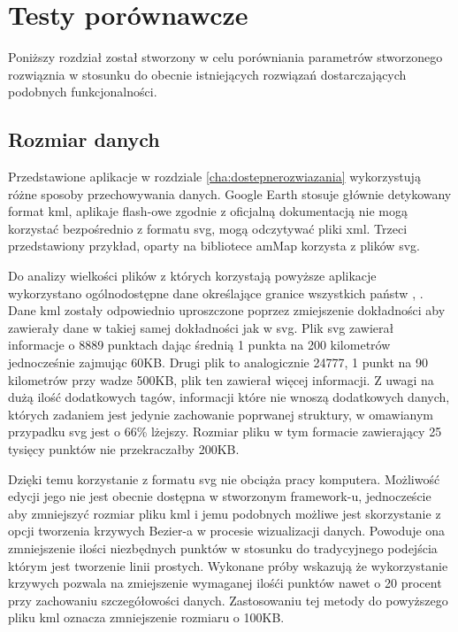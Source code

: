 \chapter{Testy porównawcze}
\label{cha:comparisonTests}

Poniższy rozdział został stworzony w celu porówniania parametrów stworzonego rozwiąznia w stosunku do obecnie istniejących rozwiązań dostarczających podobnych funkcjonalności.

\section{Rozmiar danych}
\label{sec:dataSize}

Przedstawione aplikacje w rozdziale \ref{cha:dostepnerozwiazania} wykorzystują różne sposoby przechowywania danych. Google Earth stosuje głównie detykowany format kml, aplikaje flash-owe zgodnie z oficjalną dokumentacją \cite{flashFormats} nie mogą korzystać bezpośrednio z formatu svg, mogą odczytywać pliki xml. Trzeci przedstawiony przykład, oparty na bibliotece amMap korzysta z plików svg.

Do analizy wielkości plików z których korzystają powyższe aplikacje wykorzystano ogólnodostępne dane określające granice wszystkich państw \cite{kmlExample}, \cite{svgExample}. Dane kml zostały odpowiednio uproszczone poprzez zmiejszenie dokładności aby zawierały dane w takiej samej dokładności jak w svg. Plik svg zawierał informacje o 8889 punktach dając średnią 1 punkta na 200 kilometrów jednocześnie zajmując 60KB. Drugi plik to analogicznie 24777, 1 punkt na 90 kilometrów przy wadze 500KB, plik ten zawierał więcej informacji. Z uwagi na dużą ilość dodatkowych tagów, informacji które nie wnoszą dodatkowych danych, których zadaniem jest jedynie zachowanie poprwanej struktury, w omawianym przypadku svg jest o 66\% lżejszy. Rozmiar pliku w tym formacie zawierający 25 tysięcy punktów nie przekraczałby 200KB.

Dzięki temu korzystanie z formatu svg nie obciąża pracy komputera. Możliwość edycji jego nie jest obecnie dostępna w stworzonym framework-u, jednoczeście aby zmniejszyć rozmiar pliku kml i jemu podobnych możliwe jest skorzystanie z opcji tworzenia krzywych Bezier-a w procesie wizualizacji danych. Powoduje ona zmniejszenie ilości niezbędnych punktów w stosunku do tradycyjnego podejścia którym jest tworzenie linii prostych. Wykonane próby wskazują że wykorzystanie krzywych pozwala na zmiejszenie wymaganej ilośći punktów nawet o 20 procent przy zachowaniu szczegółowości danych. Zastosowaniu tej metody do powyższego pliku kml oznacza zmniejszenie rozmiaru o 100KB.


